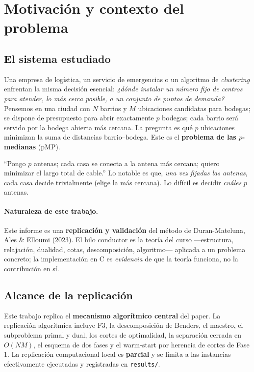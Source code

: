\section{Motivación y contexto del problema}
\label{sec:motivacion}

\subsection{El sistema estudiado}
Una empresa de logística, un servicio de emergencias o un algoritmo de \textit{clustering}
enfrentan la misma decisión esencial: \emph{¿dónde instalar un número fijo de centros para
atender, lo más cerca posible, a un conjunto de puntos de demanda?} Pensemos en una ciudad con
$N$ barrios y $M$ ubicaciones candidatas para bodegas; se dispone de presupuesto para abrir
exactamente $p$ bodegas; cada barrio será servido por la bodega abierta más cercana. La pregunta
es qué $p$ ubicaciones minimizan la suma de distancias barrio--bodega. Este es el
\textbf{problema de las $p$-medianas} (pMP).

\begin{intuicion}
``Pongo $p$ antenas; cada casa se conecta a la antena más cercana; quiero minimizar el largo
total de cable.'' Lo notable es que, \emph{una vez fijadas las antenas}, cada casa decide
trivialmente (elige la más cercana). Lo difícil es decidir \emph{cuáles} $p$ antenas.
\end{intuicion}

\paragraph{Naturaleza de este trabajo.} Este informe es una \textbf{replicación y validación}
del método de Duran-Mateluna, Ales \& Elloumi (2023). El hilo conductor es la teoría del curso
—estructura, relajación, dualidad, cotas, descomposición, algoritmo— aplicada a un problema
concreto; la implementación en C es \emph{evidencia} de que la teoría funciona, no la
contribución en sí.

\subsection{Alcance de la replicación}
Este trabajo replica el \textbf{mecanismo algorítmico central} del paper. La replicación
algorítmica incluye F3, la descomposición de Benders, el maestro, el subproblema primal y dual,
los cortes de optimalidad, la separación cerrada en $O(NM)$, el esquema de dos fases y el
warm-start por herencia de cortes de Fase 1. La replicación computacional local es \textbf{parcial}
y se limita a las instancias efectivamente ejecutadas y registradas en \texttt{results/}.

